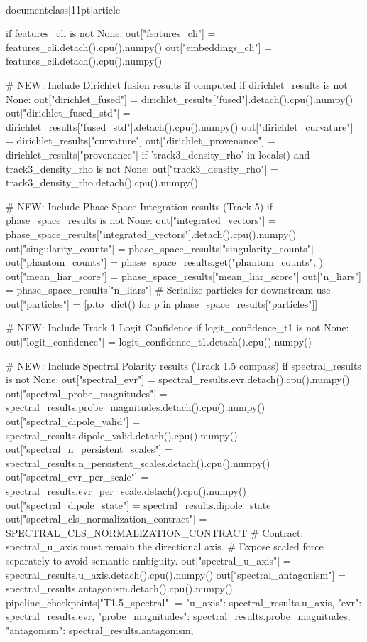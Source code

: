 \\documentclass[11pt]{article}
\begin{document}
\begin{CodeBlock}
        if features_cli is not None:
            out["features_cli"] = features_cli.detach().cpu().numpy()
            out["embeddings_cli"] = features_cli.detach().cpu().numpy()
        
        # NEW: Include Dirichlet fusion results if computed
        if dirichlet_results is not None:
            out["dirichlet_fused"] = dirichlet_results["fused"].detach().cpu().numpy()
            out["dirichlet_fused_std"] = dirichlet_results["fused_std"].detach().cpu().numpy()
            out["dirichlet_curvature"] = dirichlet_results["curvature"]
            out["dirichlet_provenance"] = dirichlet_results["provenance"]
            if 'track3_density_rho' in locals() and track3_density_rho is not None:
                out["track3_density_rho"] = track3_density_rho.detach().cpu().numpy()

        # NEW: Include Phase-Space Integration results (Track 5)
        if phase_space_results is not None:
            out["integrated_vectors"] = phase_space_results["integrated_vectors"].detach().cpu().numpy()
            out["singularity_counts"] = phase_space_results["singularity_counts"]
            out["phantom_counts"] = phase_space_results.get("phantom_counts", {})
            out["mean_liar_score"] = phase_space_results["mean_liar_score"]
            out["n_liars"] = phase_space_results["n_liars"]
            # Serialize particles for downstream use
            out["particles"] = [p.to_dict() for p in phase_space_results["particles"]]

        # NEW: Include Track 1 Logit Confidence
        if logit_confidence_t1 is not None:
            out["logit_confidence"] = logit_confidence_t1.detach().cpu().numpy()

        # NEW: Include Spectral Polarity results (Track 1.5 compass)
        if spectral_results is not None:
            out["spectral_evr"] = spectral_results.evr.detach().cpu().numpy()
            out["spectral_probe_magnitudes"] = spectral_results.probe_magnitudes.detach().cpu().numpy()
            out["spectral_dipole_valid"] = spectral_results.dipole_valid.detach().cpu().numpy()
            out["spectral_n_persistent_scales"] = spectral_results.n_persistent_scales.detach().cpu().numpy()
            out["spectral_evr_per_scale"] = spectral_results.evr_per_scale.detach().cpu().numpy()
            out["spectral_dipole_state"] = spectral_results.dipole_state
            out["spectral_cls_normalization_contract"] = SPECTRAL_CLS_NORMALIZATION_CONTRACT
            # Contract: spectral_u_axis must remain the directional axis.
            # Expose scaled force separately to avoid semantic ambiguity.
            out["spectral_u_axis"] = spectral_results.u_axis.detach().cpu().numpy()
            out["spectral_antagonism"] = spectral_results.antagonism.detach().cpu().numpy()
            pipeline_checkpoints["T1.5_spectral"] = {
                "u_axis": spectral_results.u_axis,
                "evr": spectral_results.evr,
                "probe_magnitudes": spectral_results.probe_magnitudes,
                "antagonism": spectral_results.antagonism,
            }


\end{CodeBlock}
\end{document}
